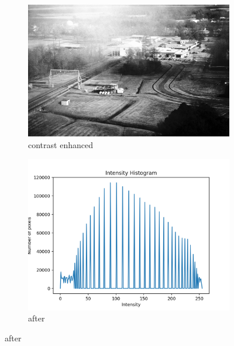 \documentclass[11pt,a4paper]{article}
\begin{document}
\begin{figure}[h]
	\ContinuedFloat
	\centering
	\begin{subfigure}[h]{0.7\textwidth}
		\includegraphics[width=\textwidth]{figs/lc2_ce}
		\caption{contrast enhanced}
		\label{fig:lc2_after}
	\end{subfigure}
	
	\begin{subfigure}[h]{0.75\textwidth}
		\includegraphics[width=\textwidth]{figs/lc2_hist_aft}
		\caption{after}
		\label{fig:hist_aft_2}
	\end{subfigure}
\end{figure}

\clearpage
\end{document}
